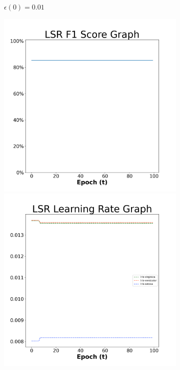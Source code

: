 \begin{figure}[H]
\begin{subfigure}{0.3\textwidth}
  \caption{$\epsilon(0)=0.01$}
\end{subfigure}\hfil %
\begin{subfigure}{0.3\textwidth}
  \includegraphics[width=\linewidth]{images/exper2/iris/LSR_0.03_f1.png}
  \includegraphics[width=\linewidth]{images/exper2/iris/LSR_0.03_lr.png}

\end{subfigure}
\end{figure}

